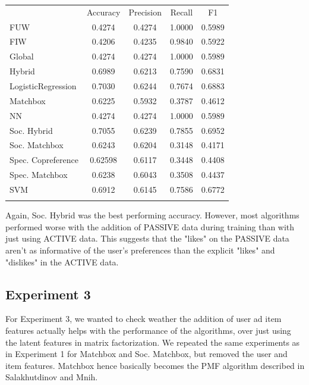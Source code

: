 \begin{table}
\begin{tabular}{ l  c  c  c  c }
\hline\noalign{\smallskip}
 & Accuracy & Precision & Recall & F1 \\
  \noalign{\smallskip}\hline\noalign{\smallskip}
FUW &  0.4274 & 0.4274  & 1.0000 & 0.5989 \\
FIW & 0.4206  & 0.4235 & 0.9840 & 0.5922  \\
Global & 0.4274 & 0.4274  & 1.0000 & 0.5989 \\
Hybrid & 0.6989 & 0.6213 & 0.7590 & 0.6831 \\
LogisticRegression & 0.7030 & 0.6244 & 0.7674 & 0.6883 \\
Matchbox & 0.6225  & 0.5932 & 0.3787  & 0.4612 \\
NN & 0.4274 & 0.4274  & 1.0000 & 0.5989 \\
Soc. Hybrid & 0.7055 & 0.6239 & 0.7855 & 0.6952 \\
Soc. Matchbox & 0.6243 & 0.6204  & 0.3148  & 0.4171 \\
Spec. Copreference & 0.62598 & 0.6117 & 0.3448  & 0.4408  \\
Spec. Matchbox & 0.6238 & 0.6043  & 0.3508  & 0.4437 \\
SVM & 0.6912 & 0.6145 & 0.7586 & 0.6772  \\
\noalign{\smallskip}\hline
 \end{tabular} 
\end{table}

Again, Soc. Hybrid was the best performing accuracy. However, most algorithms performed worse with the addition of PASSIVE data during training than with just using ACTIVE data. This suggests that the "likes" on the PASSIVE data aren't as informative of the user's preferences than the explicit "likes" and "dislikes" in the ACTIVE data.

\subsection{Experiment 3}
\label{sec:2}

For Experiment 3,  we wanted to check weather the addition of user ad item features actually helps with the performance of the algorithms, over just using the latent features in matrix factorization. We repeated the same experiments as in Experiment 1 for Matchbox and Soc. Matchbox, but removed the user and item features. Matchbox hence basically becomes the PMF algorithm described in Salakhutdinov and Mnih.


